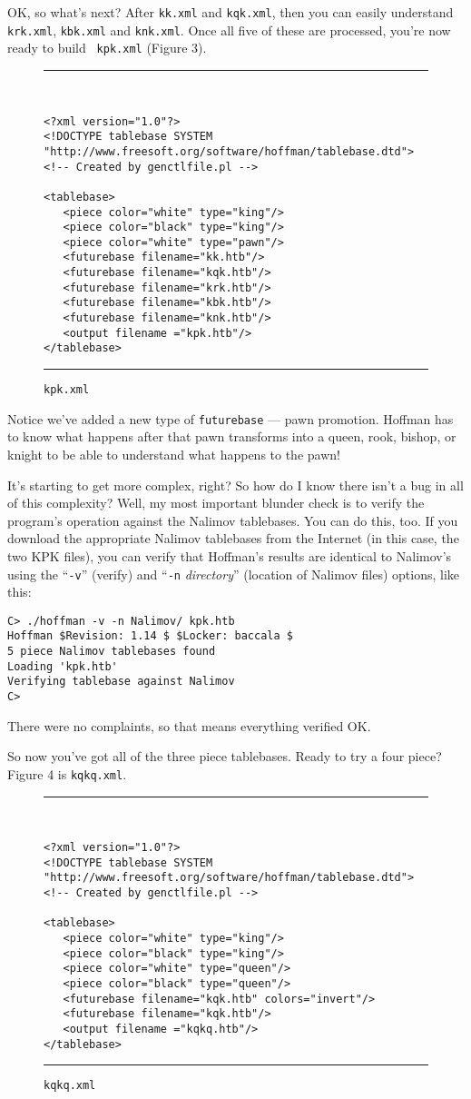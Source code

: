 \documentclass[11pt]{article}
\begin{document}
OK, so what's next?  After {\tt kk.xml} and {\tt kqk.xml}, then you
can easily understand {\tt krk.xml}, {\tt kbk.xml} and {\tt knk.xml}.
Once all five of these are processed, you're now ready to build {\tt
kpk.xml} (Figure 3).

\begin{figure}
\hrule\ 
{\small\begin{verbatim}
<?xml version="1.0"?>
<!DOCTYPE tablebase SYSTEM "http://www.freesoft.org/software/hoffman/tablebase.dtd">
<!-- Created by genctlfile.pl -->

<tablebase>
   <piece color="white" type="king"/>
   <piece color="black" type="king"/>
   <piece color="white" type="pawn"/>
   <futurebase filename="kk.htb"/>
   <futurebase filename="kqk.htb"/>
   <futurebase filename="krk.htb"/>
   <futurebase filename="kbk.htb"/>
   <futurebase filename="knk.htb"/>
   <output filename ="kpk.htb"/>
</tablebase>
\end{verbatim}}
\hrule
\caption{\tt kpk.xml}
\end{figure}

Notice we've added a new type of {\tt futurebase} --- pawn promotion.
Hoffman has to know what happens after that pawn transforms into a
queen, rook, bishop, or knight to be able to understand what happens
to the pawn!

It's starting to get more complex, right?  So how do I know there
isn't a bug in all of this complexity?  Well, my most important
blunder check is to verify the program's operation against the Nalimov
tablebases.  You can do this, too.  If you download the appropriate
Nalimov tablebases from the Internet (in this case, the two KPK
files), you can verify that Hoffman's results are identical to
Nalimov's using the ``{\tt -v}'' (verify) and ``{\tt -n} {\it
directory}'' (location of Nalimov files) options, like this:

\begin{verbatim}
C> ./hoffman -v -n Nalimov/ kpk.htb
Hoffman $Revision: 1.14 $ $Locker: baccala $
5 piece Nalimov tablebases found
Loading 'kpk.htb'
Verifying tablebase against Nalimov
C>
\end{verbatim}

There were no complaints, so that means everything verified OK.

So now you've got all of the three piece tablebases.  Ready to try a
four piece?  Figure 4 is {\tt kqkq.xml}.

\begin{figure}
\hrule\ 
{\small\begin{verbatim}
<?xml version="1.0"?>
<!DOCTYPE tablebase SYSTEM "http://www.freesoft.org/software/hoffman/tablebase.dtd">
<!-- Created by genctlfile.pl -->

<tablebase>
   <piece color="white" type="king"/>
   <piece color="black" type="king"/>
   <piece color="white" type="queen"/>
   <piece color="black" type="queen"/>
   <futurebase filename="kqk.htb" colors="invert"/>
   <futurebase filename="kqk.htb"/>
   <output filename ="kqkq.htb"/>
</tablebase>
\end{verbatim}}
\hrule
\caption{\tt kqkq.xml}
\end{figure}
\end{document}
